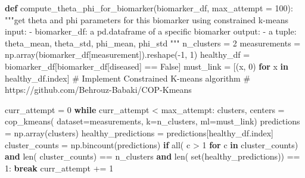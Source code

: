 \documentclass[
  letterpaper,
  DIV=11,
  numbers=noendperiod]{scrreprt}
\newenvironment{Shaded}{\begin{snugshade}}{\end{snugshade}}
\newcommand{\BuiltInTok}[1]{\textcolor[rgb]{0.00,0.23,0.31}{#1}}
\newcommand{\CommentTok}[1]{\textcolor[rgb]{0.37,0.37,0.37}{#1}}
\newcommand{\ControlFlowTok}[1]{\textcolor[rgb]{0.00,0.23,0.31}{\textbf{#1}}}
\newcommand{\DecValTok}[1]{\textcolor[rgb]{0.68,0.00,0.00}{#1}}
\newcommand{\KeywordTok}[1]{\textcolor[rgb]{0.00,0.23,0.31}{\textbf{#1}}}
\newcommand{\NormalTok}[1]{\textcolor[rgb]{0.00,0.23,0.31}{#1}}
\newcommand{\OperatorTok}[1]{\textcolor[rgb]{0.37,0.37,0.37}{#1}}
\newcommand{\StringTok}[1]{\textcolor[rgb]{0.13,0.47,0.30}{#1}}
\newcommand{\VariableTok}[1]{\textcolor[rgb]{0.07,0.07,0.07}{#1}}
\begin{document}
\begin{Shaded}
\begin{Highlighting}[]
\KeywordTok{def}\NormalTok{ compute\_theta\_phi\_for\_biomarker(biomarker\_df, max\_attempt }\OperatorTok{=} \DecValTok{100}\NormalTok{):}
    \CommentTok{"""get theta and phi parameters for this biomarker using constrained k{-}means}
\CommentTok{    input: }
\CommentTok{        {-} biomarker\_df: a pd.dataframe of a specific biomarker}
\CommentTok{    output: }
\CommentTok{        {-} a tuple: theta\_mean, theta\_std, phi\_mean, phi\_std}
\CommentTok{    """}
\NormalTok{    n\_clusters }\OperatorTok{=} \DecValTok{2}
\NormalTok{    measurements }\OperatorTok{=}\NormalTok{ np.array(biomarker\_df[}\StringTok{\textquotesingle{}measurement\textquotesingle{}}\NormalTok{]).reshape(}\OperatorTok{{-}}\DecValTok{1}\NormalTok{, }\DecValTok{1}\NormalTok{)}
\NormalTok{    healthy\_df }\OperatorTok{=}\NormalTok{ biomarker\_df[biomarker\_df[}\StringTok{\textquotesingle{}diseased\textquotesingle{}}\NormalTok{] }\OperatorTok{==} \VariableTok{False}\NormalTok{]}
\NormalTok{    must\_link }\OperatorTok{=}\NormalTok{ [(x, }\DecValTok{0}\NormalTok{) }\ControlFlowTok{for}\NormalTok{ x }\KeywordTok{in}\NormalTok{ healthy\_df.index]}
    \CommentTok{\# Implement Constrained K{-}means algorithm}
    \CommentTok{\# https://github.com/Behrouz{-}Babaki/COP{-}Kmeans}

\NormalTok{    curr\_attempt }\OperatorTok{=} \DecValTok{0}
    \ControlFlowTok{while}\NormalTok{ curr\_attempt }\OperatorTok{\textless{}}\NormalTok{ max\_attempt:}
\NormalTok{        clusters, centers }\OperatorTok{=}\NormalTok{ cop\_kmeans(}
\NormalTok{            dataset}\OperatorTok{=}\NormalTok{measurements, k}\OperatorTok{=}\NormalTok{n\_clusters, ml}\OperatorTok{=}\NormalTok{must\_link)}
\NormalTok{        predictions }\OperatorTok{=}\NormalTok{ np.array(clusters)}
\NormalTok{        healthy\_predictions }\OperatorTok{=}\NormalTok{ predictions[healthy\_df.index]}
\NormalTok{        cluster\_counts }\OperatorTok{=}\NormalTok{ np.bincount(predictions)}
        \ControlFlowTok{if} \BuiltInTok{all}\NormalTok{(}
\NormalTok{            c }\OperatorTok{\textgreater{}} \DecValTok{1} \ControlFlowTok{for}\NormalTok{ c }\KeywordTok{in}\NormalTok{ cluster\_counts) }\KeywordTok{and} \BuiltInTok{len}\NormalTok{(}
\NormalTok{                cluster\_counts) }\OperatorTok{==}\NormalTok{ n\_clusters }\KeywordTok{and} \BuiltInTok{len}\NormalTok{(}
                    \BuiltInTok{set}\NormalTok{(healthy\_predictions)) }\OperatorTok{==} \DecValTok{1}\NormalTok{:}
            \ControlFlowTok{break} 
\NormalTok{        curr\_attempt }\OperatorTok{+=} \DecValTok{1}
    

\end{Highlighting}
\end{Shaded}
\end{document}
